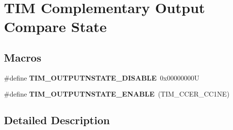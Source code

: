 \hypertarget{group___t_i_m___output___compare___n___state}{}\section{T\+IM Complementary Output Compare State}
\label{group___t_i_m___output___compare___n___state}
\subsection*{Macros}
\begin{DoxyCompactItemize}
\item 
\mbox{\label{group___t_i_m___output___compare___n___state_ga07bb7288fc4ed155301a3276908a23a0}} 
\#define {\bfseries T\+I\+M\+\_\+\+O\+U\+T\+P\+U\+T\+N\+S\+T\+A\+T\+E\+\_\+\+D\+I\+S\+A\+B\+LE}~0x00000000U
\item 
\mbox{\label{group___t_i_m___output___compare___n___state_ga3323d8c81a7f3940aa290d160dea3e0d}} 
\#define {\bfseries T\+I\+M\+\_\+\+O\+U\+T\+P\+U\+T\+N\+S\+T\+A\+T\+E\+\_\+\+E\+N\+A\+B\+LE}~(T\+I\+M\+\_\+\+C\+C\+E\+R\+\_\+\+C\+C1\+NE)
\end{DoxyCompactItemize}


\subsection{Detailed Description}
